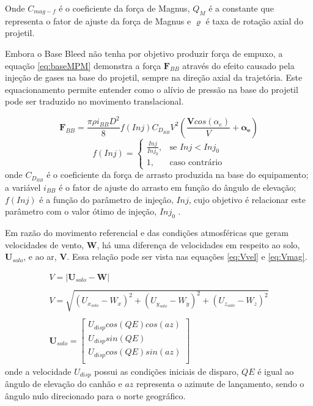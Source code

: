 Onde \(C_{mag-f}\) é o coeficiente da força de Magnus, \(Q_{M}\) é a constante que representa o fator de ajuste da força de Magnus e \(\varrho\) é taxa de rotação axial do projetil.

Embora o Base Bleed não tenha por objetivo produzir força de empuxo, a equação \ref{eq:baseMPM} demonstra a força \(\textbf{F}_{BB}\) através do efeito causado pela injeção de gases na base do projetil, sempre na direção axial da trajetória. Este equacionamento permite entender como o alívio de pressão na base do projetil pode ser traduzido no movimento translacional.

\begin{equation} \label{eq:baseMPM}
    \boldsymbol{F}_{BB} = \frac{\pi \rho i_{BB} D^{2}}{8} f(Inj) C_{D_{BB}}V^{2} \left(\frac{\boldsymbol{V}cos(\alpha_{e})}{V} +\boldsymbol{\alpha_{e}}\right)
\end{equation}
%
\begin{equation}
f(Inj) =\begin{cases}
			\frac{Inj}{Inj_{0}}, & \text{se \(Inj < Inj_{0}\)}\\
            1, & \text{caso contrário}
		 \end{cases}
\end{equation}
%
onde \(C_{D_{BB}}\) é o coeficiente da força de arrasto produzida na base do equipamento; a variável \(i_{BB}\) é o fator de ajuste do arrasto em função do ângulo de elevação; \(f(Inj)\) é a função do parâmetro de injeção, \(Inj\), cujo objetivo é relacionar este parâmetro com o valor ótimo de injeção, \(Inj_{0}\) \cite{DAVENAS1993329}.

Em razão do movimento referencial e das condições atmosféricas que geram velocidades de vento, \(\boldsymbol{W}\), há uma diferença de velocidades em respeito ao solo, \(\boldsymbol{U}_{solo}\), e ao ar, \(\boldsymbol{V}\). Essa relação pode ser vista nas equações \ref{eq:Vvel} e \ref{eq:Vmag}.

\begin{gather}
    \label{eq:Vvel}
    V = |\boldsymbol{U}_{solo} - \boldsymbol{W}| \\ 
    \nonumber\\
    \label{eq:Vmag}
    V = \sqrt{(U_{x_{solo}}-W_{x})^2 + (U_{y_{solo}}-W_{y})^2 + (U_{z_{solo}}-W_{z})^2} \\
    \nonumber\\
    \label{eq:Uvec}
    \boldsymbol{U}_{solo} = \begin{bmatrix} 
        U_{disp}cos(QE)cos(az) \\
        U_{disp}sin(QE)\\
        U_{disp}cos(QE)sin(az) \\
    \end{bmatrix}
\end{gather}
%
onde a velocidade \(U_{disp}\) possui as condições iniciais de disparo, \(QE\) é igual ao ângulo de elevação do canhão e \(az\) representa o azimute de lançamento, sendo o ângulo nulo direcionado para o norte geográfico.

